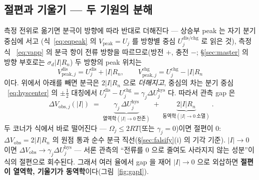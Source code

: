 \documentclass[11pt,a4paper]{article}
\newcommand{\peak}{\mathrm{peak}}
\newcommand{\dis}{\mathrm{dis}}
\newcommand{\chg}{\mathrm{chg}}
\newcommand{\hys}{\mathrm{hys}}
\newcommand{\obs}{\mathrm{obs}}
\begin{document}
\subsection{절편과 기울기 — 두 기원의 분해}
측정 전위로 옮기면 분극이 방향에 따라 반대로 더해진다 — 상승부 peak 는 자기 분기 중심에 서고
(식~\eqref{eq:eqpeak} 의 $V_\peak=U_j$ 를 방향별 중심 $U_j^{\dis/\chg}$ 로 읽은 것), 측정식
~\eqref{eq:vapp} 의 분극 항이 전류 방향을 따르므로(방전 $+$, 충전 $-$; \S\ref{sec:master} 의 방향
부호로는 $\sigma_d|I|R_n$) 두 방향의 peak 위치는
\begin{equation}
V_{\peak,j}^{\dis}=U_j^{\dis}+|I|R_n,\qquad
V_{\peak,j}^{\chg}=U_j^{\chg}-|I|R_n
\label{eq:hyspeakpos}
\end{equation}
이다. 위에서 아래를 빼면 분극은 $2|I|R_n$ 으로 \emph{더해지고}, 중심의 차는 분기 중심
~\eqref{eq:hyscenter} 의 $\pm\tfrac12$ 대칭에서 $U_j^{\dis}-U_j^{\chg}=\gamma_j\Delta U_j^\hys$
다. 따라서 관측 gap 은
\begin{equation}
\boxed{\;\Delta V_{\obs,j}(|I|)\;=\;
\underbrace{\gamma_j\,\Delta U_j^\hys}_{\text{열역학}(|I|\to0\ \text{잔존})}
\;+\;\underbrace{2|I|R_n}_{\text{동역학}(|I|\to0\ \text{소멸})}\;.}
\label{eq:hysobsgap}
\end{equation}
두 코너가 식에서 바로 떨어진다 — $\Omega_j\le2RT$(또는 $\gamma_j=0$)이면 절편이 $0$:
$\Delta V_{\obs}=2|I|R_n$ 의 원점 통과 순수 분극 직선(\S\ref{sec:falsify}(i) 의 기각 기준).
$|I|\to0$ 이면 $\Delta V_{\obs}\to\gamma_j\Delta U_j^\hys$ — 서론 관측의 ``전류를 $0$ 으로
줄여도 사라지지 않는 성분''이 식의 절편으로 회수된다. 그래서 여러 율에서 gap 을 재어 $|I|\to0$ 으로
외삽하면 \textbf{절편이 열역학, 기울기가 동역학}이다(그림~\ref{fig:gapI}).
\end{document}
